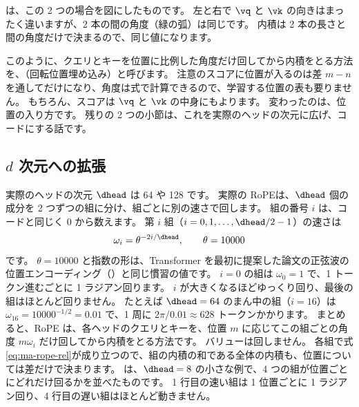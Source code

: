 は、この 2 つの場合を図にしたものです。
左と右で $\vq$ と $\vk$ の向きはまったく違いますが、2 本の間の角度（緑の弧）は同じです。
内積は 2 本の長さと間の角度だけで決まるので、同じ値になります。

このように、クエリとキーを位置に比例した角度だけ回してから内積をとる方法を、（回転位置埋め込み）\cite{su2024roformer}と呼びます。
注意のスコアに位置が入るのは差 $m-n$ を通してだけになり、角度は式で計算できるので、学習する位置の表も要りません。
もちろん、スコアは $\vq$ と $\vk$ の中身にもよります。
変わったのは、位置の入り方です。
残りの 2 つの小節は、これを実際のヘッドの次元に広げ、コードにする話です。

\subsection*{$d$ 次元への拡張}

実際のヘッドの次元 $\dhead$ は 64 や 128 です。
実際の RoPE\cite{su2024roformer}は、$\dhead$ 個の成分を 2 つずつの組に分け、組ごとに別の速さで回します。
組の番号 $i$ は、コードと同じく 0 から数えます。
第 $i$ 組（$i=0,1,\dots,\dhead/2-1$）の速さは
\begin{equation}
\omega_i=\theta^{-2i/\dhead},\qquad \theta=10000
\label{eq:ma-rope-freq}
\end{equation}
です。
$\theta=10000$ と指数の形は、Transformer を最初に提案した論文\cite{vaswani2017attention}の正弦波の位置エンコーディング（）と同じ慣習の値です。
$i=0$ の組は $\omega_0=1$ で、1 トークン進むごとに 1 ラジアン回ります。
$i$ が大きくなるほどゆっくり回り、最後の組はほとんど回りません。
たとえば $\dhead=64$ のまん中の組（$i=16$）は $\omega_{16}=10000^{-1/2}=0.01$ で、1 周に $2\pi/0.01\approx628$ トークンかかります。
まとめると、RoPE は、各ヘッドのクエリとキーを、位置 $m$ に応じてこの組ごとの角度 $m\omega_i$ だけ回してから内積をとる方法です。
バリューは回しません。
各組で式\eqref{eq:ma-rope-rel}が成り立つので、組の内積の和である全体の内積も、位置については差だけで決まります。
は、$\dhead=8$ の小さな例で、4 つの組が位置ごとにどれだけ回るかを並べたものです。
1 行目の速い組は 1 位置ごとに 1 ラジアン回り、4 行目の遅い組はほとんど動きません。

